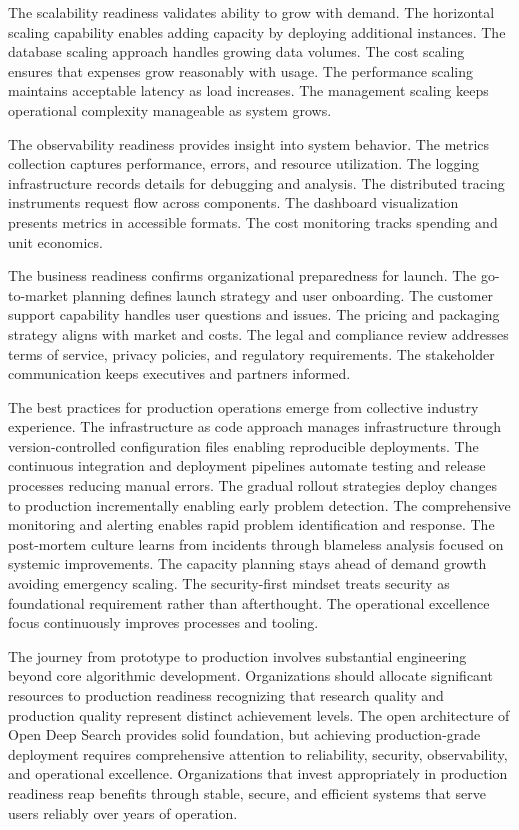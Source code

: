 The scalability readiness validates ability to grow with demand. The horizontal scaling capability enables adding capacity by deploying additional instances. The database scaling approach handles growing data volumes. The cost scaling ensures that expenses grow reasonably with usage. The performance scaling maintains acceptable latency as load increases. The management scaling keeps operational complexity manageable as system grows.

The observability readiness provides insight into system behavior. The metrics collection captures performance, errors, and resource utilization. The logging infrastructure records details for debugging and analysis. The distributed tracing instruments request flow across components. The dashboard visualization presents metrics in accessible formats. The cost monitoring tracks spending and unit economics.

The business readiness confirms organizational preparedness for launch. The go-to-market planning defines launch strategy and user onboarding. The customer support capability handles user questions and issues. The pricing and packaging strategy aligns with market and costs. The legal and compliance review addresses terms of service, privacy policies, and regulatory requirements. The stakeholder communication keeps executives and partners informed.

The best practices for production operations emerge from collective industry experience. The infrastructure as code approach manages infrastructure through version-controlled configuration files enabling reproducible deployments. The continuous integration and deployment pipelines automate testing and release processes reducing manual errors. The gradual rollout strategies deploy changes to production incrementally enabling early problem detection. The comprehensive monitoring and alerting enables rapid problem identification and response. The post-mortem culture learns from incidents through blameless analysis focused on systemic improvements. The capacity planning stays ahead of demand growth avoiding emergency scaling. The security-first mindset treats security as foundational requirement rather than afterthought. The operational excellence focus continuously improves processes and tooling.

The journey from prototype to production involves substantial engineering beyond core algorithmic development. Organizations should allocate significant resources to production readiness recognizing that research quality and production quality represent distinct achievement levels. The open architecture of Open Deep Search provides solid foundation, but achieving production-grade deployment requires comprehensive attention to reliability, security, observability, and operational excellence. Organizations that invest appropriately in production readiness reap benefits through stable, secure, and efficient systems that serve users reliably over years of operation.
